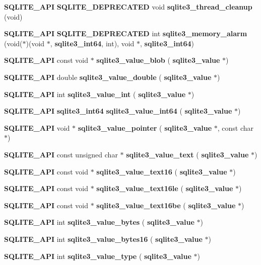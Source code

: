 \begin{DoxyCompactItemize}
\item 
\textbf{ S\+Q\+L\+I\+T\+E\+\_\+\+A\+PI} \textbf{ S\+Q\+L\+I\+T\+E\+\_\+\+D\+E\+P\+R\+E\+C\+A\+T\+ED} void \textbf{ sqlite3\+\_\+thread\+\_\+cleanup} (void)
\item 
\textbf{ S\+Q\+L\+I\+T\+E\+\_\+\+A\+PI} \textbf{ S\+Q\+L\+I\+T\+E\+\_\+\+D\+E\+P\+R\+E\+C\+A\+T\+ED} int \textbf{ sqlite3\+\_\+memory\+\_\+alarm} (void($\ast$)(void $\ast$, \textbf{ sqlite3\+\_\+int64}, int), void $\ast$, \textbf{ sqlite3\+\_\+int64})
\item 
\textbf{ S\+Q\+L\+I\+T\+E\+\_\+\+A\+PI} const void $\ast$ \textbf{ sqlite3\+\_\+value\+\_\+blob} (\textbf{ sqlite3\+\_\+value} $\ast$)
\item 
\textbf{ S\+Q\+L\+I\+T\+E\+\_\+\+A\+PI} double \textbf{ sqlite3\+\_\+value\+\_\+double} (\textbf{ sqlite3\+\_\+value} $\ast$)
\item 
\textbf{ S\+Q\+L\+I\+T\+E\+\_\+\+A\+PI} int \textbf{ sqlite3\+\_\+value\+\_\+int} (\textbf{ sqlite3\+\_\+value} $\ast$)
\item 
\textbf{ S\+Q\+L\+I\+T\+E\+\_\+\+A\+PI} \textbf{ sqlite3\+\_\+int64} \textbf{ sqlite3\+\_\+value\+\_\+int64} (\textbf{ sqlite3\+\_\+value} $\ast$)
\item 
\textbf{ S\+Q\+L\+I\+T\+E\+\_\+\+A\+PI} void $\ast$ \textbf{ sqlite3\+\_\+value\+\_\+pointer} (\textbf{ sqlite3\+\_\+value} $\ast$, const char $\ast$)
\item 
\textbf{ S\+Q\+L\+I\+T\+E\+\_\+\+A\+PI} const unsigned char $\ast$ \textbf{ sqlite3\+\_\+value\+\_\+text} (\textbf{ sqlite3\+\_\+value} $\ast$)
\item 
\textbf{ S\+Q\+L\+I\+T\+E\+\_\+\+A\+PI} const void $\ast$ \textbf{ sqlite3\+\_\+value\+\_\+text16} (\textbf{ sqlite3\+\_\+value} $\ast$)
\item 
\textbf{ S\+Q\+L\+I\+T\+E\+\_\+\+A\+PI} const void $\ast$ \textbf{ sqlite3\+\_\+value\+\_\+text16le} (\textbf{ sqlite3\+\_\+value} $\ast$)
\item 
\textbf{ S\+Q\+L\+I\+T\+E\+\_\+\+A\+PI} const void $\ast$ \textbf{ sqlite3\+\_\+value\+\_\+text16be} (\textbf{ sqlite3\+\_\+value} $\ast$)
\item 
\textbf{ S\+Q\+L\+I\+T\+E\+\_\+\+A\+PI} int \textbf{ sqlite3\+\_\+value\+\_\+bytes} (\textbf{ sqlite3\+\_\+value} $\ast$)
\item 
\textbf{ S\+Q\+L\+I\+T\+E\+\_\+\+A\+PI} int \textbf{ sqlite3\+\_\+value\+\_\+bytes16} (\textbf{ sqlite3\+\_\+value} $\ast$)
\item 
\textbf{ S\+Q\+L\+I\+T\+E\+\_\+\+A\+PI} int \textbf{ sqlite3\+\_\+value\+\_\+type} (\textbf{ sqlite3\+\_\+value} $\ast$)

\end{DoxyCompactItemize}
